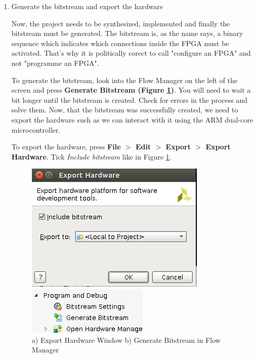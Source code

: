 \documentclass{article}
\begin{document}
\begin{itemize}
\begin{enumerate}
\noindent\rule{16.5cm}{1pt}


\item Generate the bitstream and export the hardware


Now, the project needs to be synthesized, implemented and finally the bitstream must 
be generated.
The bitstream is, as the name says, a binary sequence which indicates which connections inside the FPGA must be activated. That's why it is politically corect to call "configure an FPGA" and not "programme an FPGA".

To generate the bitstream, look into the Flow Manager on the left of the screen and press \textbf{Generate Bitstream (Figure \ref{fig:export_hardware_generate_bitstream})}. You will need to wait a bit longer until the bitstream is created. Check for errors in the process and solve them. Now, that the bitstream was successfully created, we need to export the hardware such as we can interact with it using the ARM dual-core microcontroller. 

To export the hardware, press \textbf{File $>$ Edit $>$ Export $>$ Export Hardware}. Tick \textit{Include bitstream} like in Figure \ref{fig:export_hardware_generate_bitstream}.


 \begin{figure}[h!]
\centering
\begin{minipage}{.425\textwidth}
  \centering
  \includegraphics[width=0.8\linewidth]{img/export_hardware.png}
\end{minipage}%
\begin{minipage}{.425\textwidth}
  \centering
  \includegraphics[width=0.8\linewidth]{img/generate_bitstream.png}
\end{minipage}
\caption{a) Export Hardware Window b) Generate Bitstream in Flow Manager}
\label{fig:export_hardware_generate_bitstream}
\end{figure}



\end{enumerate}
\end{itemize}
\end{document}
